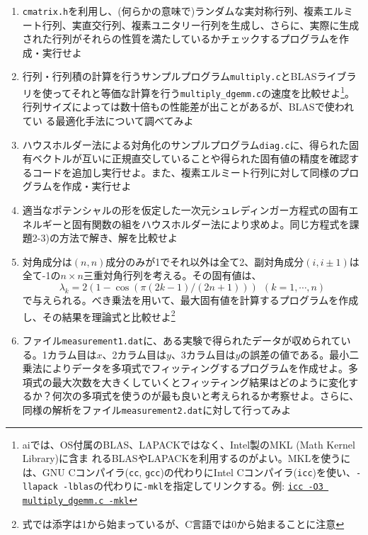\documentclass[11pt]{jarticle}
\begin{document}
\noindent {\bf [対角化]}
\begin{enumerate}
\renewcommand{\labelenumi}{4-\arabic{enumi})}
    
\item {\tt cmatrix.h}を利用し、(何らかの意味で)ランダムな実対称行列、複素エルミート行列、実直交行列、複素ユニタリー行列を生成し、さらに、実際に生成された行列がそれらの性質を満たしているかチェックするプログラムを作成・実行せよ

  \item 行列・行列積の計算を行うサンプルプログラム{\tt multiply.c}とBLASライブラリを使ってそれと等価な計算を行う{\tt multiply\_dgemm.c}の速度を比較せよ\footnote{aiでは、OS付属のBLAS、LAPACKではなく、Intel製のMKL (Math Kernel Library)に含ま
れるBLASやLAPACKを利用するのがよい。MKLを使うには、GNU Cコンパイラ({\tt cc}, {\tt gcc})の代わりにIntel Cコンパイラ({\tt icc})を使い、{\tt -llapack -lblas}の代わりに{\tt -mkl}を指定してリンクする。例: \underline{\tt icc -O3 multiply\_dgemm.c -mkl}}。行列サイズによっては数十倍もの性能差が出ことがあるが、BLASで使われてい
る最適化手法について調べてみよ

\item ハウスホルダー法による対角化のサンプルプログラム{\tt diag.c}に、得られた固有ベクトルが互いに正規直交していることや得られた固有値の精度を確認するコードを追加し実行せよ。また、複素エルミート行列に対して同様のプログラムを作成・実行せよ

\item 適当なポテンシャルの形を仮定した一次元シュレディンガー方程式の固有エネルギーと固有関数の組をハウスホルダー法により求めよ。同じ方程式を課題2-3)の方法で解き、解を比較せよ

\item 対角成分は$(n,n)$成分のみが1でそれ以外は全て2、副対角成分$(i, i \pm 1)$は全て-1の$n \times n$三重対角行列を考える。その固有値は、
  \[ \lambda_k = 2 (1 - \cos (\pi (2 k - 1) / (2 n + 1))) \ \ (k=1,\cdots,n)\]
  で与えられる。べき乗法を用いて、最大固有値を計算するプログラムを作成し、その結果を理論式と比較せよ\footnote{式では添字は1から始まっているが、C言語では0から始まることに注意}

\item ファイル{\tt measurement1.dat}に、ある実験で得られたデータが収められている。1カラム目は$x$、2カラム目は$y$、3カラム目は$y$の誤差の値である。最小二乗法によりデータを多項式でフィッティングするプログラムを作成せよ。多項式の最大次数を大きくしていくとフィッティング結果はどのように変化するか？何次の多項式を使うのが最も良いと考えられるか考察せよ。さらに、同様の解析をファイル{\tt measurement2.dat}に対して行ってみよ


\end{enumerate}
\end{document}
